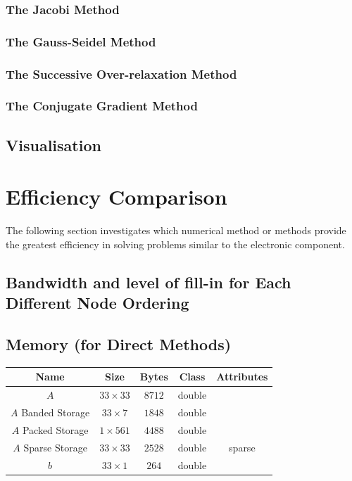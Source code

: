 \documentclass[12pt,a4paper]{article}
\begin{document}
\subsubsection{The Jacobi Method}

\subsubsection{The Gauss-Seidel Method}

\subsubsection{The Successive Over-relaxation Method}

\subsubsection{The Conjugate Gradient Method}

\subsection{Visualisation}

\section{Efficiency Comparison}
The following section investigates which numerical method or methods provide the greatest efficiency in solving problems similar to the electronic component.

\subsection{Bandwidth and level of fill-in for Each Different Node Ordering}


\subsection{Memory (for Direct Methods)}
\begin{center}
\begin{tabular}{c c c c c}
Name & Size & Bytes & Class & Attributes \\
\hline
$A$ & $33 \times 33$ & $8712$ & double & \\
$A$ Banded Storage & $33 \times 7$ & $1848$ & double & \\
$A$ Packed Storage & $1 \times 561$ & $4488$ & double & \\
$A$ Sparse Storage & $33 \times 33$ & $2528$ & double & sparse \\
$b$ & $33 \times 1$ & $264$ & double & \\
\end{tabular}
\end{center}
\end{document}
